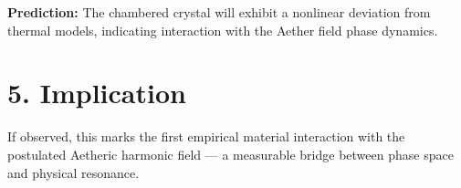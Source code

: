 \documentclass[12pt]{book}
\begin{document}
\textbf{Prediction:} The chambered crystal will exhibit a nonlinear deviation from thermal models, indicating interaction with the Aether field phase dynamics.

\section*{5. Implication}

If observed, this marks the first empirical material interaction with the postulated Aetheric harmonic field — a measurable bridge between phase space and physical resonance.




\end{document}
